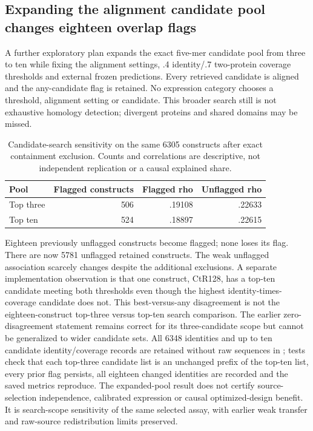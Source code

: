 \subsection{Expanding the alignment candidate pool changes eighteen overlap flags}
A further exploratory plan expands the exact five-mer candidate pool from three to ten while fixing the alignment settings, .4 identity/.7 two-protein coverage thresholds and external frozen predictions. Every retrieved candidate is aligned and the any-candidate flag is retained. No expression category chooses a threshold, alignment setting or candidate. This broader search still is not exhaustive homology detection; divergent proteins and shared domains may be missed.
\begin{table}[ht]\centering
\caption{Candidate-search sensitivity on the same 6305 constructs after exact containment exclusion. Counts and correlations are descriptive, not independent replication or a causal explained share.}
\begin{tabular}{lrrr}\hline
Pool & Flagged constructs & Flagged rho & Unflagged rho\\\hline
Top three &506&.19108&.22633\\
Top ten &524&.18897&.22615\\\hline
\end{tabular}\end{table}


Eighteen previously unflagged constructs become flagged; none loses its flag. There are now 5781 unflagged retained constructs. The weak unflagged association scarcely changes despite the additional exclusions. A separate implementation observation is that one construct, CtR128, has a top-ten candidate meeting both thresholds even though the highest identity-times-coverage candidate does not. This best-versus-any disagreement is not the eighteen-construct top-three versus top-ten search comparison. The earlier zero-disagreement statement remains correct for its three-candidate scope but cannot be generalized to wider candidate sets.
All 6348 identities and up to ten candidate identity/coverage records are retained without raw sequences in ; tests check that each top-three candidate list is an unchanged prefix of the top-ten list, every prior flag persists, all eighteen changed identities are recorded and the saved metrics reproduce. The expanded-pool result does not certify source-selection independence, calibrated expression or causal optimized-design benefit. It is search-scope sensitivity of the same selected assay, with earlier weak transfer and raw-source redistribution limits preserved.

